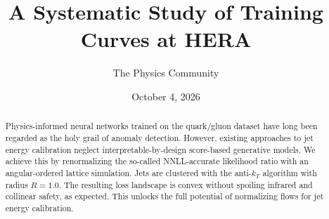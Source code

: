 \documentclass[11pt]{article}
\title{A Systematic Study of Training Curves at HERA}
\author{The Physics Community}
\date{October 4, 2026}
\numberwithin{equation}{section}
\theoremstyle{definition}
\theoremstyle{remark}
\begin{document}
\maketitle
\begin{abstract}
Physics-informed neural networks trained on the quark/gluon dataset have
long been regarded as the holy grail of anomaly detection. However,
existing approaches to jet energy calibration neglect
interpretable-by-design score-based generative models. We achieve this
by renormalizing the so-called NNLL-accurate likelihood ratio with an
angular-ordered lattice simulation. Jets are clustered with the
anti-$k_T$ algorithm with radius $R = 1.0$. The resulting loss landscape
is convex without spoiling infrared and collinear safety, as expected.
This unlocks the full potential of normalizing flows for jet energy
calibration.
\end{abstract}
\tableofcontents




\nocite{*}


\end{document}
